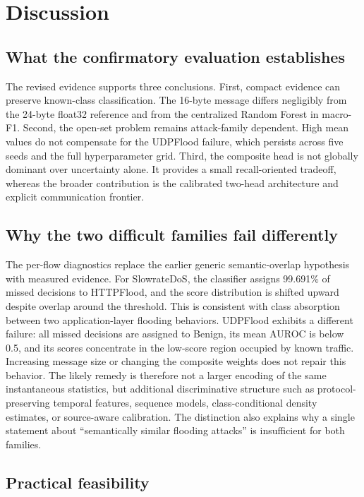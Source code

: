 \section{Discussion}

\subsection{What the confirmatory evaluation establishes}

The revised evidence supports three conclusions. First, compact evidence can preserve known-class classification. The 16-byte message differs negligibly from the 24-byte float32 reference and from the centralized Random Forest in macro-F1. Second, the open-set problem remains attack-family dependent. High mean values do not compensate for the UDPFlood failure, which persists across five seeds and the full hyperparameter grid. Third, the composite head is not globally dominant over uncertainty alone. It provides a small recall-oriented tradeoff, whereas the broader contribution is the calibrated two-head architecture and explicit communication frontier.

\subsection{Why the two difficult families fail differently}

The per-flow diagnostics replace the earlier generic semantic-overlap hypothesis with measured evidence. For SlowrateDoS, the classifier assigns 99.691\% of missed decisions to HTTPFlood, and the score distribution is shifted upward despite overlap around the threshold. This is consistent with class absorption between two application-layer flooding behaviors. UDPFlood exhibits a different failure: all missed decisions are assigned to Benign, its mean AUROC is below 0.5, and its scores concentrate in the low-score region occupied by known traffic. Increasing message size or changing the composite weights does not repair this behavior. The likely remedy is therefore not a larger encoding of the same instantaneous statistics, but additional discriminative structure such as protocol-preserving temporal features, sequence models, class-conditional density estimates, or source-aware calibration. The distinction also explains why a single statement about ``semantically similar flooding attacks'' is insufficient for both families.

\subsection{Practical feasibility}


